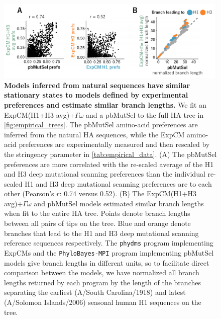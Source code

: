 \documentclass[11pt]{article}
\begin{document}
\begin{figure}[h!]
\centerline{\includegraphics[width=0.99\textwidth]{fig7.pdf}}
\caption{\label{fig:phylobayes}
\textbf{Models inferred from natural sequences have similar stationary states to models defined by experimental preferences and estimate similar branch lengths.}
We fit an ExpCM(H1+H3 avg)+$\Gamma\omega$ and a pbMutSel to the full HA tree in \ref{fig:empirical_trees}. 
The pbMutSel amino-acid preferences are inferred from the natural HA sequences, while the ExpCM amino-acid preferences are experimentally measured and then rescaled by the stringency parameter in \ref{tab:empirical_data}. 
(A) The pbMutSel preferences are more correlated with the re-scaled average of the H1 and H3 deep mutational scanning preferences than the individual re-scaled H1 and H3 deep mutational scanning preferences are to each other (Pearson's $r$: 0.74 versus 0.52). 
(B) The ExpCM(H1+H3 avg)+$\Gamma\omega$ and pbMutSel models estimated similar branch lengths when fit to the entire HA tree. 
Points denote branch lengths between all pairs of tips on the tree. 
Blue and orange denote branches that lead to the H1 and H3 deep mutational scanning reference sequences respectively. 
The \texttt{phydms} program implementing ExpCMs and the \texttt{PhyloBayes-MPI} program implementing pbMutSel models give branch lengths in different units, so to facilitate direct comparison between the models, we have normalized all branch lengths returned by each program by the length of the branches separating the earliest (A/South Carolina/1918) and latest (A/Solomon Islands/2006) seasonal human H1 sequences on the tree. 
}
\end{figure}
\end{document}
